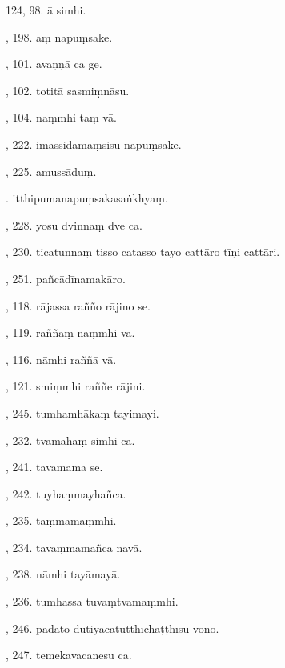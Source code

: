 124, 98. ā simhi.\hfill \pageref{sut:124}\par {}, 198. aṃ napuṃsake.\hfill \pageref{sut:125}\par {}, 101. avaṇṇā ca ge.\hfill \pageref{sut:126}\par {}, 102. totitā sasmiṃnāsu.\hfill \pageref{sut:127}\par {}, 104. naṃmhi taṃ vā.\hfill \pageref{sut:128}\par {}, 222. imassidamaṃsisu napuṃsake.\hfill \pageref{sut:129}\par {}, 225. amussāduṃ.\hfill \pageref{sut:138}\par {}. itthipumanapuṃsakasaṅkhyaṃ.\hfill \pageref{sut:131}\par {}, 228. yosu dvinnaṃ dve ca.\hfill \pageref{sut:132}\par {}, 230. ticatunnaṃ tisso catasso tayo cattāro tīṇi cattāri.\hfill \pageref{sut:133}\par {}, 251. pañcādīnamakāro.\hfill \pageref{sut:134}\par {}, 118. rājassa rañño rājino se.\hfill \pageref{sut:135}\par {}, 119. raññaṃ naṃmhi vā.\hfill \pageref{sut:136}\par {}, 116. nāmhi raññā vā.\hfill \pageref{sut:137}\par {}, 121. smiṃmhi raññe rājini.\hfill \pageref{sut:138}\par {}, 245. tumhamhākaṃ tayimayi.\hfill \pageref{sut:139}\par {}, 232. tvamahaṃ simhi ca.\hfill \pageref{sut:140}\par {}, 241. tavamama se.\hfill \pageref{sut:141}\par {}, 242. tuyhaṃmayhañca.\hfill \pageref{sut:142}\par {}, 235. taṃmamaṃmhi.\hfill \pageref{sut:143}\par {}, 234. tavaṃmamañca navā.\hfill \pageref{sut:144}\par {}, 238. nāmhi tayāmayā.\hfill \pageref{sut:145}\par {}, 236. tumhassa tuvaṃtvamaṃmhi.\hfill \pageref{sut:146}\par {}, 246. padato dutiyācatutthīchaṭṭhīsu vono.\hfill \pageref{sut:147}\par {}, 247. temekavacanesu ca.\hfill \pageref{sut:148}\par \noindent
